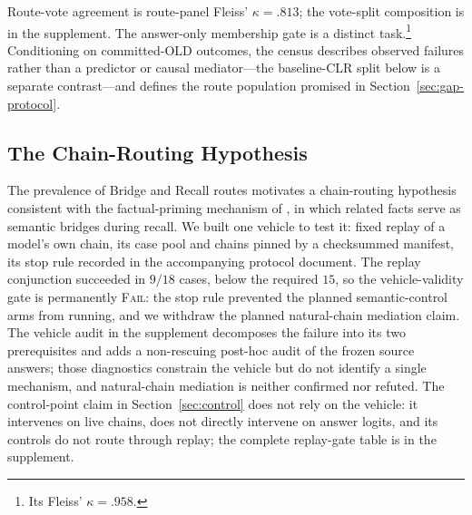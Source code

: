 \documentclass[letterpaper]{article} %
\begin{document}
Route-vote agreement is route-panel Fleiss' \(\kappa=.813\); the vote-split composition is in the supplement. %
The answer-only membership gate is a distinct task.\footnote{Its Fleiss' \(\kappa=.958\).} %
Conditioning on committed-OLD outcomes, the census describes observed failures rather than a predictor or causal mediator---the baseline-CLR split below is a separate contrast---and defines the route population promised in Section~\ref{sec:gap-protocol}.

\subsection{The Chain-Routing Hypothesis}
\label{sec:diagnosis-replay}

The prevalence of Bridge and Recall routes motivates a chain-routing hypothesis consistent with the factual-priming mechanism of \citet{gekhman2026thinking}, in which related facts serve as semantic bridges during recall.  We built one vehicle to test it: fixed replay of a model's own chain, its case pool and chains pinned by a checksummed manifest, its stop rule recorded in the accompanying protocol document.
The replay conjunction succeeded in \(9/18\) cases, below the required \(15\), so the vehicle-validity gate is permanently \textsc{Fail}: the stop rule prevented the planned semantic-control arms from running, and we withdraw the planned natural-chain mediation claim. %
The vehicle audit in the supplement decomposes the failure into its two prerequisites and adds a non-rescuing post-hoc audit of the frozen source answers; those diagnostics constrain the vehicle but do not identify a single mechanism, and natural-chain mediation is neither confirmed nor refuted.
The control-point claim in Section~\ref{sec:control} does not rely on the vehicle: it intervenes on live chains, does not directly intervene on answer logits, and its controls do not route through replay; the complete replay-gate table is in the supplement.
\end{document}
